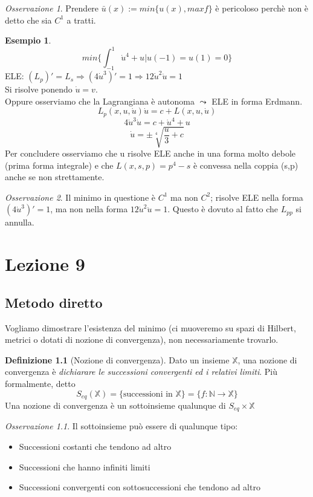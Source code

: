 \documentclass[a4paper]{book}
\theoremstyle{definition}
\newtheorem{ex}{Esempio}
\newtheorem{defn}{Definizione}
\theoremstyle{remark}
\newtheorem{oss}{Osservazione}
\theoremstyle{definition}
\newcommand{\bbx}{\mathbb{X}}
\newcommand{\ra}{\Rightarrow}
\begin{document}
\begin{oss}
	Prendere $\bar{u}(x) := min\{u(x), maxf\}$ è pericoloso perchè non è detto che sia $C^1$ a tratti.
\end{oss}

\begin{ex}
	$$min\{\int_{-1}^{1}\dot{u}^4 + u | u(-1)=u(1)=0\} $$
	ELE: $(L_p)' = L_s \ra (4\dot{u}^3)' = 1 \ra 12 \dot{u}^2\ddot{u} = 1$\\
	Si risolve ponendo $\dot{u}=v$.\\
	Oppure osserviamo che la Lagrangiana è autonoma $\leadsto$ ELE in forma Erdmann.
	$$ L_p(x, u, \dot{u})\dot{u} = c + L(x,u,\dot{u})$$
	$$ 4 \dot{u}^3\dot{u} = c + \dot{u}^4 + u$$
	$$\dot{u} = \pm\sqrt[4]{\frac u3 + c}$$
	Per concludere osserviamo che u risolve ELE anche in una forma molto debole (prima forma integrale) e che $L(x,s,p) = p^4 - s$ è convessa nella coppia (s,p) anche se non strettamente.
\end{ex}

\begin{oss}
	Il minimo in questione è $C^1$ ma non $C^2$; risolve ELE nella forma $(4\dot{u}^3)' = 1$, ma non nella forma $12 \dot{u}^2 \ddot{u} = 1$. Questo è dovuto al fatto che $L_{pp}$ si annulla.
\end{oss}


\chapter{Lezione 9}
\section{Metodo diretto}
Vogliamo dimostrare l'esistenza del minimo (ci muoveremo su spazi di Hilbert, metrici o dotati di nozione di convergenza), non necessariamente trovarlo.

\begin{defn}[Nozione di convergenza]
	Dato un insieme $\bbx$, una nozione di convergenza è \textit{dichiarare le successioni convergenti ed i relativi limiti}. Più formalmente, detto
	$$
	S_{eq}(\bbx) = \{\text{successioni in }\bbx\} = \{f:\mathbb{N} \to \bbx \}
	$$
	Una nozione di convergenza è un sottoinsieme qualunque di $S_{eq}\times\bbx$
\end{defn}

\begin{oss}
	Il sottoinsieme può essere di qualunque tipo:
	\begin{itemize}
		\item Successioni costanti che tendono ad altro
		\item Successioni che hanno infiniti limiti
		\item Successioni convergenti con sottosuccessioni che tendono ad altro
	\end{itemize}
\end{oss}
\end{document}
